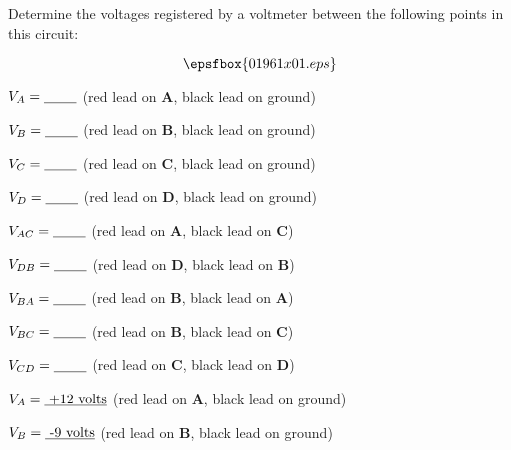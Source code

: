

Determine the voltages registered by a voltmeter between the following points in this circuit:

$$\epsfbox{01961x01.eps}$$

$V_A = \hbox{\underbar{ \hskip 20pt}}$ (red lead on {\bf A}, black lead on ground)

\vskip 5pt

$V_B = \hbox{\underbar{ \hskip 20pt}}$ (red lead on {\bf B}, black lead on ground)

\vskip 5pt

$V_C = \hbox{\underbar{ \hskip 20pt}}$ (red lead on {\bf C}, black lead on ground)

\vskip 5pt

$V_D = \hbox{\underbar{ \hskip 20pt}}$ (red lead on {\bf D}, black lead on ground)

\vskip 20pt

$V_{AC} = \hbox{\underbar{ \hskip 20pt}}$ (red lead on {\bf A}, black lead on {\bf C})

\vskip 5pt

$V_{DB} = \hbox{\underbar{ \hskip 20pt}}$ (red lead on {\bf D}, black lead on {\bf B})

\vskip 5pt

$V_{BA} = \hbox{\underbar{ \hskip 20pt}}$ (red lead on {\bf B}, black lead on {\bf A})

\vskip 5pt

$V_{BC} = \hbox{\underbar{ \hskip 20pt}}$ (red lead on {\bf B}, black lead on {\bf C})

\vskip 5pt

$V_{CD} = \hbox{\underbar{ \hskip 20pt}}$ (red lead on {\bf C}, black lead on {\bf D})

\vskip 5pt







$V_A = \hbox{\underbar{ +12 volts}}$ (red lead on {\bf A}, black lead on ground)

\vskip 5pt

$V_B = \hbox{\underbar{ -9 volts}}$ (red lead on {\bf B}, black lead on ground)

\vskip 5pt

